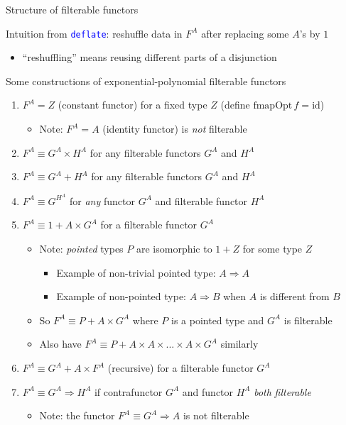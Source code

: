 \documentclass[english]{beamer}
\begin{document}
\begin{frame}{Structure of filterable functors}

Intuition from \texttt{\textcolor{blue}{\footnotesize{}deflate}}:
reshuffle data in $F^{A}$ after replacing some $A$'s by $1$
\begin{itemize}
\item ``reshuffling'' means reusing different parts of a disjunction
\end{itemize}
Some constructions of exponential-polynomial filterable functors 
\begin{enumerate}
\item $F^{A}=Z$ (constant functor) for a fixed type $Z$ (define $\text{fmapOpt}\,f=\text{id}$)
\begin{itemize}
\item Note: $F^{A}=A$ (identity functor) is \emph{not} filterable
\end{itemize}
\item $F^{A}\equiv G^{A}\times H^{A}$ for any filterable functors $G^{A}$
and $H^{A}$
\item $F^{A}\equiv G^{A}+H^{A}$ for any filterable functors $G^{A}$ and
$H^{A}$
\item $F^{A}\equiv G^{H^{A}}$ for \emph{any} functor $G^{A}$ and filterable
functor $H^{A}$
\item $F^{A}\equiv1+A\times G^{A}$ for a filterable functor $G^{A}$
\begin{itemize}
\item Note: \emph{pointed} types $P$ are isomorphic to $1+Z$ for some
type $Z$
\begin{itemize}
\item Example of non-trivial pointed type: $A\Rightarrow A$
\item Example of non-pointed type: $A\Rightarrow B$ when $A$ is different
from $B$
\end{itemize}
\item So $F^{A}\equiv P+A\times G^{A}$ where $P$ is a pointed type and
$G^{A}$ is filterable
\item Also have $F^{A}\equiv P+A\times A\times...\times A\times G^{A}$
similarly
\end{itemize}
\item $F^{A}\equiv G^{A}+A\times F^{A}$ (recursive) for a filterable functor
$G^{A}$
\item $F^{A}\equiv G^{A}\Rightarrow H^{A}$ if\emph{ }contrafunctor $G^{A}$
and functor $H^{A}$ \emph{both} \emph{filterable}
\begin{itemize}
\item Note: the functor $F^{A}\equiv G^{A}\Rightarrow A$ is not filterable
\end{itemize}
\end{enumerate}
\end{frame}
\end{document}
